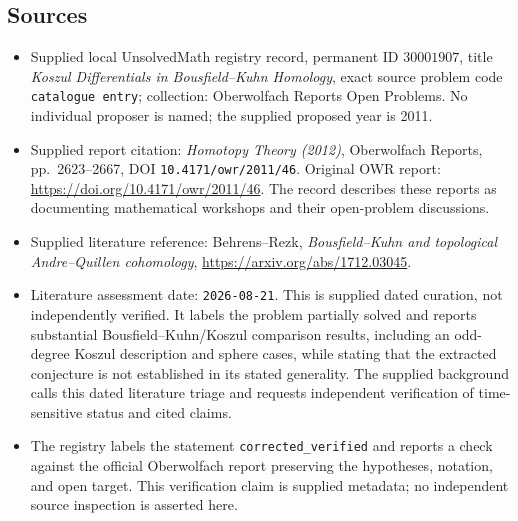 \documentclass[11pt]{article}
\begin{document}
\subsection{Sources}
\begin{itemize}
\item Supplied local UnsolvedMath registry record, permanent ID \(30001907\), title \emph{Koszul Differentials in Bousfield--Kuhn Homology}, exact source problem code \texttt{catalogue entry}; collection: Oberwolfach Reports Open Problems. No individual proposer is named; the supplied proposed year is 2011.
\item Supplied report citation: \emph{Homotopy Theory (2012)}, Oberwolfach Reports, pp.\ 2623--2667, DOI \texttt{10.4171/owr/2011/46}. Original OWR report: \url{https://doi.org/10.4171/owr/2011/46}. The record describes these reports as documenting mathematical workshops and their open-problem discussions.
\item Supplied literature reference: Behrens--Rezk, \emph{Bousfield--Kuhn and topological Andre--Quillen cohomology}, \url{https://arxiv.org/abs/1712.03045}.
\item Literature assessment date: \texttt{2026-08-21}. This is supplied dated curation, not independently verified. It labels the problem partially solved and reports substantial Bousfield--Kuhn/Koszul comparison results, including an odd-degree Koszul description and sphere cases, while stating that the extracted conjecture is not established in its stated generality. The supplied background calls this dated literature triage and requests independent verification of time-sensitive status and cited claims.
\item The registry labels the statement \texttt{corrected\_verified} and reports a check against the official Oberwolfach report preserving the hypotheses, notation, and open target. This verification claim is supplied metadata; no independent source inspection is asserted here.
\end{itemize}
\end{document}
